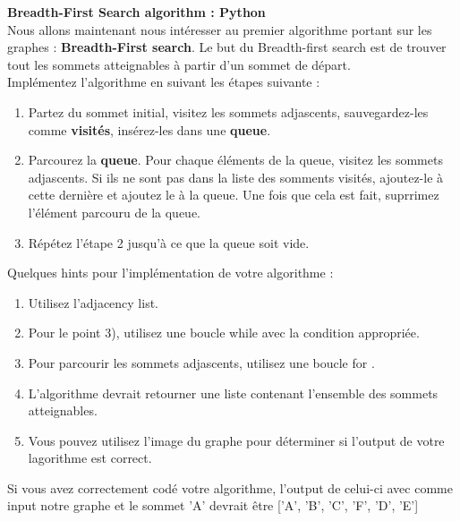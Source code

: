 \begin{Exercice}[15 minutes]  \textbf{Breadth-First Search algorithm : Python}\\
    Nous allons maintenant nous intéresser au premier algorithme portant sur les graphes : \textbf{Breadth-First search}. Le but du Breadth-first search est de trouver tout les sommets atteignables à partir d'un sommet de départ.\\
    Implémentez l'algorithme en suivant les étapes suivante :\\
    \begin{enumerate}
    
    \item Partez du sommet initial, visitez les sommets adjascents, sauvegardez-les comme \textbf{visités}, insérez-les dans une \textbf{queue}.
    
    \item Parcourez la \textbf{queue}. Pour chaque éléments de la queue, visitez les sommets adjascents. Si ils ne sont pas dans la liste des somments visités, ajoutez-le à cette dernière et ajoutez le à la queue. Une fois que cela est fait, suprrimez l'élément parcouru de la queue.
    
    \item Répétez l'étape 2 jusqu'à ce que la queue soit vide.\\

    \end{enumerate}

    \begin{conseil}
        Quelques hints pour l'implémentation de votre algorithme :
        \begin{enumerate}
            \item Utilisez l'adjacency list.
            \item Pour le point 3), utilisez une boucle while avec la condition appropriée.
            \item Pour parcourir les sommets adjascents, utilisez une boucle for .
            \item L'algorithme devrait retourner une liste contenant l'ensemble des sommets atteignables.
            \item Vous pouvez utilisez l'image du graphe pour déterminer si l'output de votre lagorithme est correct.
        \end{enumerate}
    \end{conseil}
    \begin{solution}
        
        Si vous avez correctement codé votre algorithme, l'output de celui-ci avec comme input notre graphe et le sommet 'A' devrait être ['A', 'B', 'C', 'F', 'D', 'E']
    \end{solution}
\end{Exercice}

